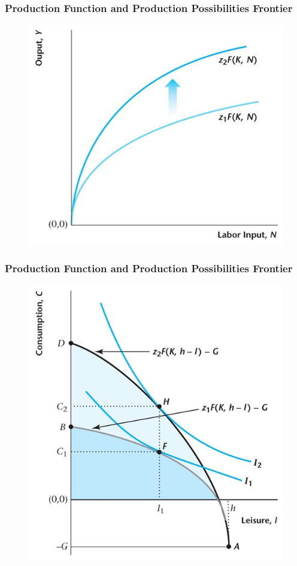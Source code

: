 \documentclass{beamer}
\begin{document}
\begin{frame}
\frametitle[alignment=center]{Production Function and Production Possibilities Frontier}
\begin{figure}
\centering
\includegraphics[scale=0.5]{Figures/W_Fig_5pt8.png}
\end{figure}
\end{frame}

\begin{frame}
\frametitle[alignment=center]{Production Function and Production Possibilities Frontier}
\begin{figure}
\centering
\includegraphics[scale=0.5]{Figures/W_Fig_5pt9.png}
\end{figure}
\end{frame}
\end{document}

